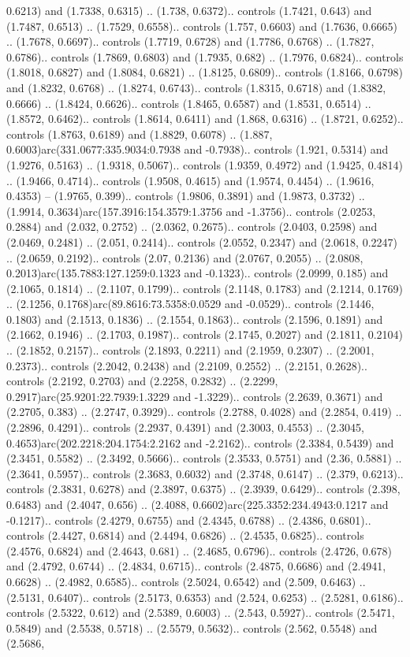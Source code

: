 0.6213) and (1.7338, 0.6315) .. (1.738, 0.6372).. controls (1.7421, 0.643) and (1.7487, 0.6513) .. (1.7529, 0.6558).. controls (1.757, 0.6603) and (1.7636, 0.6665) .. (1.7678, 0.6697).. controls (1.7719, 0.6728) and (1.7786, 0.6768) .. (1.7827, 0.6786).. controls (1.7869, 0.6803) and (1.7935, 0.682) .. (1.7976, 0.6824).. controls (1.8018, 0.6827) and (1.8084, 0.6821) .. (1.8125, 0.6809).. controls (1.8166, 0.6798) and (1.8232, 0.6768) .. (1.8274, 0.6743).. controls (1.8315, 0.6718) and (1.8382, 0.6666) .. (1.8424, 0.6626).. controls (1.8465, 0.6587) and (1.8531, 0.6514) .. (1.8572, 0.6462).. controls (1.8614, 0.6411) and (1.868, 0.6316) .. (1.8721, 0.6252).. controls (1.8763, 0.6189) and (1.8829, 0.6078) .. (1.887, 0.6003)arc(331.0677:335.9034:0.7938 and -0.7938).. controls (1.921, 0.5314) and (1.9276, 0.5163) .. (1.9318, 0.5067).. controls (1.9359, 0.4972) and (1.9425, 0.4814) .. (1.9466, 0.4714).. controls (1.9508, 0.4615) and (1.9574, 0.4454) .. (1.9616, 0.4353) -- (1.9765, 0.399).. controls (1.9806, 0.3891) and (1.9873, 0.3732) .. (1.9914, 0.3634)arc(157.3916:154.3579:1.3756 and -1.3756).. controls (2.0253, 0.2884) and (2.032, 0.2752) .. (2.0362, 0.2675).. controls (2.0403, 0.2598) and (2.0469, 0.2481) .. (2.051, 0.2414).. controls (2.0552, 0.2347) and (2.0618, 0.2247) .. (2.0659, 0.2192).. controls (2.07, 0.2136) and (2.0767, 0.2055) .. (2.0808, 0.2013)arc(135.7883:127.1259:0.1323 and -0.1323).. controls (2.0999, 0.185) and (2.1065, 0.1814) .. (2.1107, 0.1799).. controls (2.1148, 0.1783) and (2.1214, 0.1769) .. (2.1256, 0.1768)arc(89.8616:73.5358:0.0529 and -0.0529).. controls (2.1446, 0.1803) and (2.1513, 0.1836) .. (2.1554, 0.1863).. controls (2.1596, 0.1891) and (2.1662, 0.1946) .. (2.1703, 0.1987).. controls (2.1745, 0.2027) and (2.1811, 0.2104) .. (2.1852, 0.2157).. controls (2.1893, 0.2211) and (2.1959, 0.2307) .. (2.2001, 0.2373).. controls (2.2042, 0.2438) and (2.2109, 0.2552) .. (2.2151, 0.2628).. controls (2.2192, 0.2703) and (2.2258, 0.2832) .. (2.2299, 0.2917)arc(25.9201:22.7939:1.3229 and -1.3229).. controls (2.2639, 0.3671) and (2.2705, 0.383) .. (2.2747, 0.3929).. controls (2.2788, 0.4028) and (2.2854, 0.419) .. (2.2896, 0.4291).. controls (2.2937, 0.4391) and (2.3003, 0.4553) .. (2.3045, 0.4653)arc(202.2218:204.1754:2.2162 and -2.2162).. controls (2.3384, 0.5439) and (2.3451, 0.5582) .. (2.3492, 0.5666).. controls (2.3533, 0.5751) and (2.36, 0.5881) .. (2.3641, 0.5957).. controls (2.3683, 0.6032) and (2.3748, 0.6147) .. (2.379, 0.6213).. controls (2.3831, 0.6278) and (2.3897, 0.6375) .. (2.3939, 0.6429).. controls (2.398, 0.6483) and (2.4047, 0.656) .. (2.4088, 0.6602)arc(225.3352:234.4943:0.1217 and -0.1217).. controls (2.4279, 0.6755) and (2.4345, 0.6788) .. (2.4386, 0.6801).. controls (2.4427, 0.6814) and (2.4494, 0.6826) .. (2.4535, 0.6825).. controls (2.4576, 0.6824) and (2.4643, 0.681) .. (2.4685, 0.6796).. controls (2.4726, 0.678) and (2.4792, 0.6744) .. (2.4834, 0.6715).. controls (2.4875, 0.6686) and (2.4941, 0.6628) .. (2.4982, 0.6585).. controls (2.5024, 0.6542) and (2.509, 0.6463) .. (2.5131, 0.6407).. controls (2.5173, 0.6353) and (2.524, 0.6253) .. (2.5281, 0.6186).. controls (2.5322, 0.612) and (2.5389, 0.6003) .. (2.543, 0.5927).. controls (2.5471, 0.5849) and (2.5538, 0.5718) .. (2.5579, 0.5632).. controls (2.562, 0.5548) and (2.5686, 